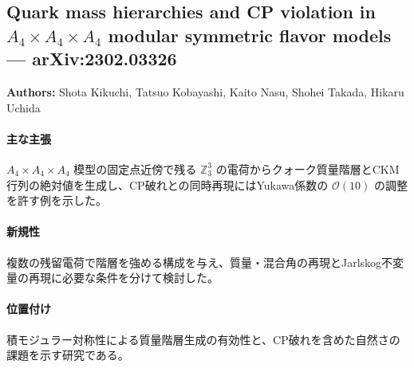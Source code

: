 \subsection{Quark mass hierarchies and CP violation in $A_4\times A_4\times A_4$ modular symmetric flavor models --- arXiv:2302.03326}

\textbf{Authors:} Shota Kikuchi, Tatsuo Kobayashi, Kaito Nasu, Shohei Takada, Hikaru Uchida

\paragraph{主な主張}
$A_4\times A_4\times A_4$ 模型の固定点近傍で残る $\mathbb{Z}_3^3$ の電荷からクォーク質量階層とCKM行列の絶対値を生成し、CP破れとの同時再現にはYukawa係数の $\mathcal{O}(10)$ の調整を許す例を示した\cite{Kikuchi:2023jap}。

\paragraph{新規性}
複数の残留電荷で階層を強める構成を与え、質量・混合角の再現とJarlskog不変量の再現に必要な条件を分けて検討した。

\paragraph{位置付け}
積モジュラー対称性による質量階層生成の有効性と、CP破れを含めた自然さの課題を示す研究である。
